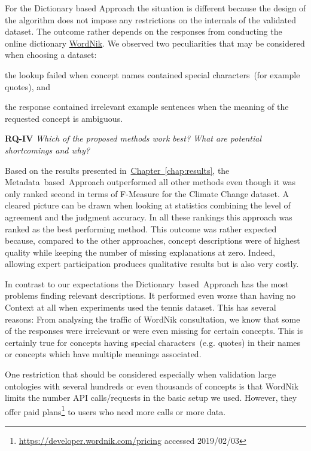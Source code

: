For the Dictionary based Approach the situation is different because the design of the algorithm does not impose any restrictions on the internals of the validated dataset. The outcome rather depends on the responses from conducting the online dictionary \hyperref[sec:wordnik]{WordNik}. We observed two peculiarities that may be considered when choosing a dataset:
\begin{inparaenum}[i)]
	\item the lookup failed when concept names contained special characters~(for example quotes), and
	\item the response contained irrelevant example sentences when the meaning of the requested concept is ambiguous.
\end{inparaenum}


\textbf{RQ-IV} \emph{Which of the proposed methods work best? What are potential shortcomings and why?} 

Based on the results presented in~\hyperref[chap:results]{Chapter~\ref*{chap:results}}, the Metadata~based~Approach outperformed all other methods even though it was only ranked second in terms of F-Measure for the Climate Change dataset. A cleared picture can be drawn when looking at statistics combining the level of agreement and the judgment accuracy. In all these rankings this approach was ranked as the best performing method. This outcome was rather expected because, compared to the other approaches, concept descriptions were of highest quality while keeping the number of missing explanations at zero. Indeed, allowing expert participation produces qualitative results but is also very costly.  

In contrast to our expectations the Dictionary~based~Approach has the most problems finding relevant descriptions. It performed even worse than having no Context at all when experiments used the tennis dataset. This has several reasons: From analysing the traffic of WordNik consultation, we know that some of the responses were irrelevant or were even missing for certain concepts. This is certainly true for concepts having special characters~(e.g. quotes) in their names or concepts which have multiple meanings associated. 

One restriction that should be considered especially when validation large ontologies with several hundreds or even thousands of concepts is that WordNik limits the number API calls/requests in the basic setup we used. However, they offer paid plans\footnote{\url{https://developer.wordnik.com/pricing} accessed 2019/02/03} to users who need more calls or more data.

